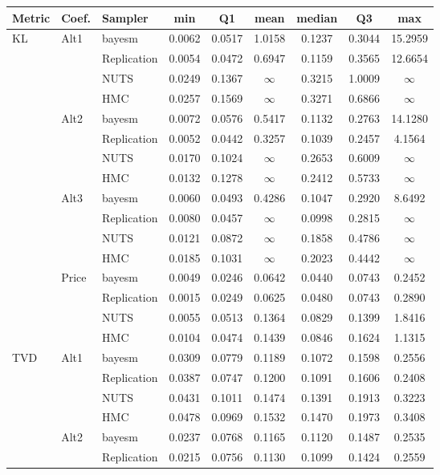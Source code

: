 \begin{tabular}{lllcccccc}
\toprule
Metric & Coef. & Sampler & min & Q1 & mean & median & Q3 & max \\
\midrule
KL & Alt1 & bayesm & 0.0062 & 0.0517 & 1.0158 & 0.1237 & 0.3044 & 15.2959 \\
 &  & Replication & 0.0054 & 0.0472 & 0.6947 & 0.1159 & 0.3565 & 12.6654 \\
 &  & NUTS & 0.0249 & 0.1367 & $\infty$ & 0.3215 & 1.0009 & $\infty$ \\
 &  & HMC & 0.0257 & 0.1569 & $\infty$ & 0.3271 & 0.6866 & $\infty$ \\
 & Alt2 & bayesm & 0.0072 & 0.0576 & 0.5417 & 0.1132 & 0.2763 & 14.1280 \\
 &  & Replication & 0.0052 & 0.0442 & 0.3257 & 0.1039 & 0.2457 & 4.1564 \\
 &  & NUTS & 0.0170 & 0.1024 & $\infty$ & 0.2653 & 0.6009 & $\infty$ \\
 &  & HMC & 0.0132 & 0.1278 & $\infty$ & 0.2412 & 0.5733 & $\infty$ \\
 & Alt3 & bayesm & 0.0060 & 0.0493 & 0.4286 & 0.1047 & 0.2920 & 8.6492 \\
 &  & Replication & 0.0080 & 0.0457 & $\infty$ & 0.0998 & 0.2815 & $\infty$ \\
 &  & NUTS & 0.0121 & 0.0872 & $\infty$ & 0.1858 & 0.4786 & $\infty$ \\
 &  & HMC & 0.0185 & 0.1031 & $\infty$ & 0.2023 & 0.4442 & $\infty$ \\
 & Price & bayesm & 0.0049 & 0.0246 & 0.0642 & 0.0440 & 0.0743 & 0.2452 \\
 &  & Replication & 0.0015 & 0.0249 & 0.0625 & 0.0480 & 0.0743 & 0.2890 \\
 &  & NUTS & 0.0055 & 0.0513 & 0.1364 & 0.0829 & 0.1399 & 1.8416 \\
 &  & HMC & 0.0104 & 0.0474 & 0.1439 & 0.0846 & 0.1624 & 1.1315 \\
TVD & Alt1 & bayesm & 0.0309 & 0.0779 & 0.1189 & 0.1072 & 0.1598 & 0.2556 \\
 &  & Replication & 0.0387 & 0.0747 & 0.1200 & 0.1091 & 0.1606 & 0.2408 \\
 &  & NUTS & 0.0431 & 0.1011 & 0.1474 & 0.1391 & 0.1913 & 0.3223 \\
 &  & HMC & 0.0478 & 0.0969 & 0.1532 & 0.1470 & 0.1973 & 0.3408 \\
 & Alt2 & bayesm & 0.0237 & 0.0768 & 0.1165 & 0.1120 & 0.1487 & 0.2535 \\
 &  & Replication & 0.0215 & 0.0756 & 0.1130 & 0.1099 & 0.1424 & 0.2559 \\

\end{tabular}
